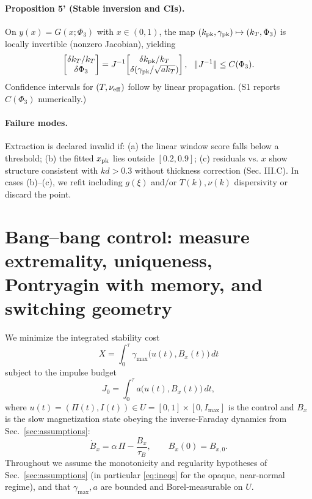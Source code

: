 \documentclass[aps,pre,twocolumn,showpacs,superscriptaddress]{revtex4-2}
\theoremstyle{definition}
\begin{document}
\paragraph*{Proposition 5' (Stable inversion and CIs).}
On $y(x)=G(x;\Phi_3)$ with $x\in(0,1)$, the map $(k_{\rm pk},\gamma_{\rm pk})\mapsto(k_T,\Phi_3)$ is locally invertible (nonzero Jacobian), yielding 
\[
\begin{bmatrix}\delta k_T/k_T\\ \delta\Phi_3\end{bmatrix}
= J^{-1}\!\begin{bmatrix}\delta k_{\rm pk}/k_T\\ \delta(\gamma_{\rm pk}/\sqrt{ak_T})\end{bmatrix},
\ \ \|J^{-1}\|\le C(\Phi_3).
\]
Confidence intervals for $(T,\nu_{\rm eff})$ follow by linear propagation. (S1 reports $C(\Phi_3)$ numerically.)

\paragraph*{Failure modes.}
Extraction is declared invalid if: (a) the linear window score falls below a threshold; (b) the fitted $x_{\rm pk}$ lies outside $[0.2,0.9]$; (c) residuals vs. $x$ show structure consistent with $kd>0.3$ without thickness correction (Sec. III.C). In cases (b)–(c), we refit including $g(\xi)$ and/or $T(k),\nu(k)$ dispersivity or discard the point.

\section{Bang--bang control: measure extremality, uniqueness, Pontryagin with memory, and switching geometry}\label{sec:bangbang}

We minimize the integrated stability cost
\begin{equation}\label{eq:X4}
X=\int_0^\tau \gamma_{\max}\big(u(t),B_x(t)\big)\,dt
\end{equation}
subject to the impulse budget
\begin{equation}\label{eq:J4}
J_0=\int_0^\tau a\big(u(t),B_x(t)\big)\,dt,
\end{equation}
where $u(t)=(\Pi(t),I(t))\in U=[0,1]\times[0,I_{\max}]$ is the control and $B_x$ is the slow magnetization state obeying the inverse‑Faraday dynamics from Sec.~\ref{sec:assumptions}:
\begin{equation}\label{eq:Bx4}
\dot B_x=\alpha\,\Pi - \frac{B_x}{\tau_B},\qquad B_x(0)=B_{x,0}.
\end{equation}
Throughout we assume the monotonicity and regularity hypotheses of Sec.~\ref{sec:assumptions} (in particular \eqref{eq:ineqs} for the opaque, near‑normal regime), and that $\gamma_{\max},a$ are bounded and Borel‑measurable on $U$.
\end{document}
